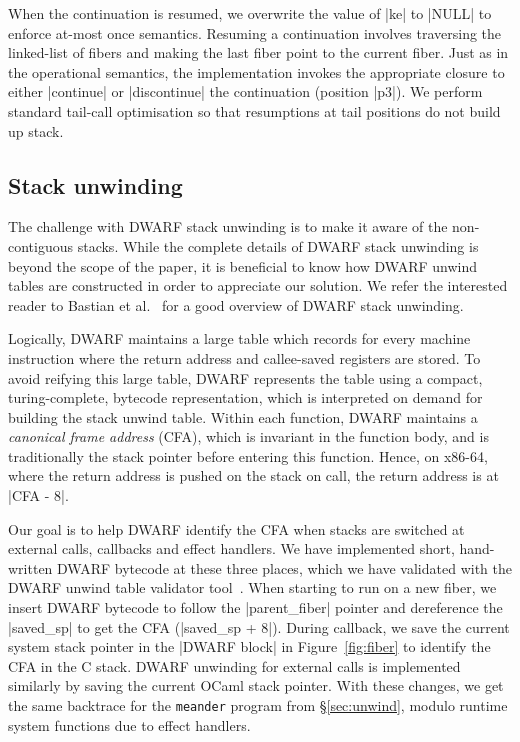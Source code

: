 \documentclass[sigplan,10pt,review,anonymous]{acmart}\settopmatter{printfolios=true,printccs=false,printacmref=false}
\begin{document}
When the continuation is resumed, we overwrite the value of |ke| to |NULL| to
enforce at-most once semantics. Resuming a continuation involves traversing the
linked-list of fibers and making the last fiber point to the current fiber.
Just as in the operational semantics, the implementation invokes the
appropriate closure to either |continue| or |discontinue| the continuation
(position |p3|). We perform standard tail-call optimisation so that resumptions
at tail positions do not build up stack.

\subsection{Stack unwinding}

The challenge with DWARF stack unwinding is to make it aware of the
non-contiguous stacks. While the complete details of DWARF stack unwinding is
beyond the scope of the paper, it is beneficial to know how DWARF unwind tables
are constructed in order to appreciate our solution. We refer the interested
reader to Bastian et al.~\cite{} for a good overview of DWARF stack unwinding.

Logically, DWARF maintains a large table which records for every machine
instruction where the return address and callee-saved registers are stored. To
avoid reifying this large table, DWARF represents the table using a compact,
turing-complete, bytecode representation, which is interpreted on demand for
building the stack unwind table. Within each function, DWARF maintains a
\emph{canonical frame address} (CFA), which is invariant in the function body,
and is traditionally the stack pointer before entering this function. Hence, on
x86-64, where the return address is pushed on the stack on call, the return
address is at |CFA - 8|.

Our goal is to help DWARF identify the CFA when stacks are switched at external
calls, callbacks and effect handlers. We have implemented short, hand-written
DWARF bytecode at these three places, which we have validated with the DWARF
unwind table validator tool~\cite{Bastian}. When starting to run on a new
fiber, we insert DWARF bytecode to follow the |parent_fiber| pointer and
dereference the |saved_sp| to get the CFA (|saved_sp + 8|). During callback, we
save the current system stack pointer in the |DWARF block| in
Figure~\ref{fig:fiber} to identify the CFA in the C stack. DWARF unwinding for
external calls is implemented similarly by saving the current OCaml stack
pointer. With these changes, we get the same backtrace for the \texttt{meander}
program from \S\ref{sec:unwind}, modulo runtime system functions due to effect
handlers.
\end{document}
